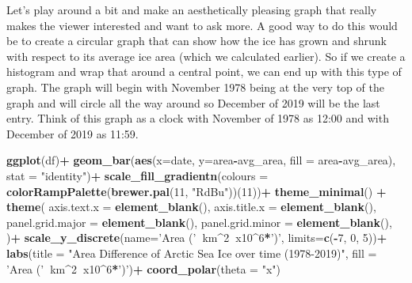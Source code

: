 \documentclass[]{article}
\newenvironment{Shaded}{\begin{snugshade}}{\end{snugshade}}
\newcommand{\KeywordTok}[1]{\textcolor[rgb]{0.13,0.29,0.53}{\textbf{#1}}}
\newcommand{\DataTypeTok}[1]{\textcolor[rgb]{0.13,0.29,0.53}{#1}}
\newcommand{\DecValTok}[1]{\textcolor[rgb]{0.00,0.00,0.81}{#1}}
\newcommand{\StringTok}[1]{\textcolor[rgb]{0.31,0.60,0.02}{#1}}
\newcommand{\OperatorTok}[1]{\textcolor[rgb]{0.81,0.36,0.00}{\textbf{#1}}}
\newcommand{\NormalTok}[1]{#1}
\begin{document}
Let's play around a bit and make an aesthetically pleasing graph that
really makes the viewer interested and want to ask more. A good way to
do this would be to create a circular graph that can show how the ice
has grown and shrunk with respect to its average ice area (which we
calculated earlier). So if we create a histogram and wrap that around a
central point, we can end up with this type of graph. The graph will
begin with November 1978 being at the very top of the graph and will
circle all the way around so December of 2019 will be the last entry.
Think of this graph as a clock with November of 1978 as 12:00 and with
December of 2019 as 11:59.

\begin{Shaded}
\begin{Highlighting}[]
\KeywordTok{ggplot}\NormalTok{(df)}\OperatorTok{+}
\StringTok{  }\KeywordTok{geom_bar}\NormalTok{(}\KeywordTok{aes}\NormalTok{(}\DataTypeTok{x=}\NormalTok{date, }\DataTypeTok{y=}\NormalTok{area}\OperatorTok{-}\NormalTok{avg_area, }\DataTypeTok{fill =}\NormalTok{ area}\OperatorTok{-}\NormalTok{avg_area), }\DataTypeTok{stat =} \StringTok{"identity"}\NormalTok{)}\OperatorTok{+}
\StringTok{  }\KeywordTok{scale_fill_gradientn}\NormalTok{(}\DataTypeTok{colours =} \KeywordTok{colorRampPalette}\NormalTok{(}\KeywordTok{brewer.pal}\NormalTok{(}\DecValTok{11}\NormalTok{, }\StringTok{"RdBu"}\NormalTok{))(}\DecValTok{11}\NormalTok{))}\OperatorTok{+}
\StringTok{  }\KeywordTok{theme_minimal}\NormalTok{() }\OperatorTok{+}\StringTok{ }
\StringTok{  }\KeywordTok{theme}\NormalTok{(}
    \DataTypeTok{axis.text.x =} \KeywordTok{element_blank}\NormalTok{(),}
    \DataTypeTok{axis.title.x =} \KeywordTok{element_blank}\NormalTok{(),}
    \DataTypeTok{panel.grid.major =} \KeywordTok{element_blank}\NormalTok{(),}
    \DataTypeTok{panel.grid.minor =} \KeywordTok{element_blank}\NormalTok{(),}
\NormalTok{  )}\OperatorTok{+}
\StringTok{  }\KeywordTok{scale_y_discrete}\NormalTok{(}\DataTypeTok{name=}\StringTok{'Area ('}\OperatorTok{~}\NormalTok{km}\OperatorTok{^}\DecValTok{2}\OperatorTok{~}\NormalTok{x10}\OperatorTok{^}\DecValTok{6}\OperatorTok{*}\StringTok{')'}\NormalTok{, }\DataTypeTok{limits=}\KeywordTok{c}\NormalTok{(}\OperatorTok{-}\DecValTok{7}\NormalTok{, }\DecValTok{0}\NormalTok{, }\DecValTok{5}\NormalTok{))}\OperatorTok{+}
\StringTok{  }\KeywordTok{labs}\NormalTok{(}\DataTypeTok{title =} \StringTok{"Area Difference of Arctic Sea Ice over time (1978-2019)"}\NormalTok{, }\DataTypeTok{fill =} \StringTok{'Area ('}\OperatorTok{~}\NormalTok{km}\OperatorTok{^}\DecValTok{2}\OperatorTok{~}\NormalTok{x10}\OperatorTok{^}\DecValTok{6}\OperatorTok{*}\StringTok{')'}\NormalTok{)}\OperatorTok{+}
\StringTok{  }\KeywordTok{coord_polar}\NormalTok{(}\DataTypeTok{theta =} \StringTok{"x"}\NormalTok{)}
\end{Highlighting}
\end{Shaded}
\end{document}
